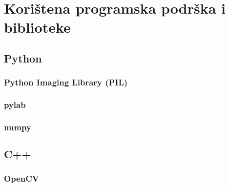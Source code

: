 \chapter{Korištena programska podrška i biblioteke}
\label{ch:podrska}

\section{Python}
\label{sec:podrskaPython}

\subsection{Python Imaging Library (PIL)}
\label{subsec:pil}

\subsection{pylab}
\label{subsec:pylab}

\subsection{numpy}
\label{subsec:numpy}

\section{C++}
\label{sec:c++}

\subsection{OpenCV}
\label{subsec:opencv}